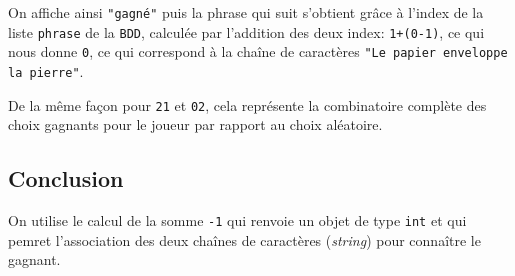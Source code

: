 On affiche ainsi \texttt{"gagné"} puis la phrase qui suit s'obtient grâce à l'index de la liste \texttt{phrase} de la \texttt{BDD}, calculée par l'addition des deux index: \texttt{1+(0-1)}, ce qui nous donne \texttt{0}, ce qui correspond à la chaîne de caractères \texttt{"Le papier enveloppe la pierre"}.
\medskip

De la même façon pour \texttt{21} et \texttt{02}, cela représente la combinatoire complète des choix gagnants pour le joueur par rapport au choix aléatoire.
\medskip

\subsection*{Conclusion}
On utilise le calcul de la somme \texttt{-1} qui renvoie un objet de type \texttt{int} et qui pemret l'association des deux chaînes de caractères (\textit{string}) pour connaître le gagnant.